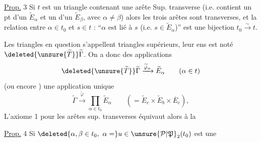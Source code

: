 \uline{Prop.} 3 \quad Si $t$ est un triangle contenant une arête Sup. transverse (i.e. contient un pt d'un $\widetilde E_\alpha$ et un d'un $\widetilde E_\beta$, avec  $\alpha\ne\beta$) alors les trois arêtes sont transverses, et la relation entre $\alpha\in t_0$ et $s\in t$ : ``$\alpha$ est lié à $s$ (i.e. $s\in\widetilde E_\alpha$)'' est une bijection $t_0\xrightarrow{\sim}t$.

Les triangles en question s'appellent triangles supérieurs, leur  ens est noté $\deleted{\unsure{\widetilde T}}\widetilde\Gamma$. On a donc des applications
\[
\deleted{\unsure{\widetilde T}}\widetilde\Gamma\xrightarrow{\widetilde\varphi_\alpha}\widetilde E_\alpha\qquad(\alpha\in t)
\]
(ou encore
)  une application unique
\[
\widetilde\Gamma\xrightarrow{\widetilde\varphi}\prod_{\alpha\in t_0}\widetilde E_\alpha
\qquad(=\widetilde E_c\times\widetilde E_b\times\overline E_c),
\]
L'axiome 1 pour les arêtes sup. transverses équivaut alors à la

\uline{Prop.} 4 \quad Si $\deleted{\alpha,\beta\in t_0,\ \alpha=}u\in\unsure{\mathcal P|\mathfrak P}_2(t_0)$ est une
